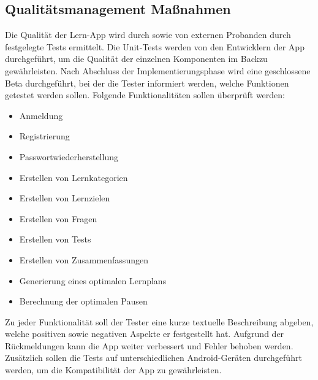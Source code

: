 \newpage
\subsection{Qualitätsmanagement Maßnahmen}
Die Qualität der Lern-App wird durch  sowie von externen Probanden durch festgelegte Tests ermittelt. Die Unit-Tests werden von den Entwicklern der App durchgeführt, um die Qualität der einzelnen Komponenten im Backzu gewährleisten. Nach Abschluss der Implementierungsphase wird eine geschlossene Beta durchgeführt, bei der die Tester informiert werden, welche Funktionen getestet werden sollen. Folgende Funktionalitäten sollen überprüft werden:
\begin{itemize}
  \item Anmeldung
  \item Registrierung
  \item Passwortwiederherstellung
  \item Erstellen von Lernkategorien
  \item Erstellen von Lernzielen
  \item Erstellen von Fragen
  \item Erstellen von Tests
  \item Erstellen von Zusammenfassungen
  \item Generierung eines optimalen Lernplans
  \item Berechnung der optimalen Pausen
\end{itemize}
\noindent
Zu jeder Funktionalität soll der Tester eine kurze textuelle Beschreibung abgeben, welche positiven sowie negativen Aspekte er festgestellt hat. Aufgrund der Rückmeldungen kann die App weiter verbessert und Fehler behoben werden.
Zusätzlich sollen die Tests auf unterschiedlichen Android-Geräten durchgeführt werden, um die Kompatibilität der App zu gewährleisten. 
